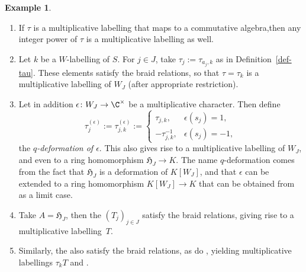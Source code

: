 \documentclass[pdftex]{sigma}
\theoremstyle{definition}
\newtheorem{Example}[Theorem]{Example}
\numberwithin{equation}{section}
\begin{document}
\begin{Example}\label{sec:ex-labellings}\qquad
\begin{enumerate}\itemsep=0pt
 \item[(i)] If $\tau$ is a multiplicative labelling that maps to a commutative algebra,then
 any integer power of $\tau$ is a multiplicative labelling as well.
 \item[(ii)]
 Let $k$ be a $W$-labelling of $S$. For $j\in J$, take $\tau_j := \tau_{a_j,k}$ as in Definition~\ref{def-tau}. These elements satisfy the braid relations, so that
 $\tau=\tau_k$ is a multiplicative labelling of $W_J$ (after
 appropriate restriction).
 \item[(iii)] Let in addition $\epsilon\colon W_J\to\C^\times$ be a multiplicative character. Then
 define
 \[
 \tau^{(\epsilon)}_j := \tau^{(\epsilon)}_{j,k} :=
 \begin{cases}
 \tau_{j,k}, & \epsilon(s_j)=1,\\
 -\tau_{j,k}^{-1}, & \epsilon(s_j)=-1,
 \end{cases}
 \]
 the \emph{$q$-deformation of $\epsilon$}. This also gives rise to
 a multiplicative labelling  of $W_J$, and even
 to a ring
 homomorphism $\mathfrak{H}_J\to K$.
 The name $q$-deformation comes from the fact that $\mathfrak{H}_J$
 is a deformation of $K[W_J]$, and that $\epsilon$ can be extended to
 a ring homomorphism $K[W_J]\to K$ that can be obtained from~ as a limit case.
 \item[(iv)] Take $A=\mathfrak{H}_J$, then the $(T_j)_{j\in J}$ satisfy the braid
 relations, giving rise to a multiplicative labelling~$T$.
 \item[(v)] Similarly, the  also satisfy the braid
 relations, as do , yielding multiplicative labellings $\tau_k T$ and .
\end{enumerate}
\end{Example}
\end{document}
